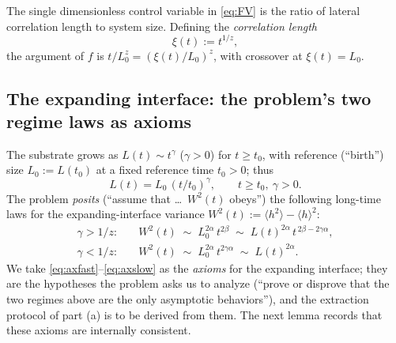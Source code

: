 \documentclass{amsart}
\theoremstyle{definition}
\newcommand{\asymp}{\sim}
\begin{document}
The single dimensionless control variable in \eqref{eq:FV} is the ratio of lateral
correlation length to system size. Defining the \emph{correlation length}
\begin{equation}\label{eq:xi}
  \xi(t):=t^{1/z},
\end{equation}
the argument of $f$ is $t/L_0^{z}=(\xi(t)/L_0)^{z}$, with crossover at
$\xi(t)=L_0$.

\subsection{The expanding interface: the problem's two regime laws as axioms}

The substrate grows as $L(t)\asymp t^{\gamma}$ ($\gamma>0$) for $t\ge t_0$, with
reference (``birth'') size $L_0:=L(t_0)$ at a fixed reference time $t_0>0$; thus
\begin{equation}\label{eq:Lt}
  L(t)=L_0\,(t/t_0)^{\gamma},\qquad t\ge t_0,\ \gamma>0.
\end{equation}
The problem \emph{posits} (``assume that \dots\ $W^2(t)$ obeys'') the following
long-time laws for the expanding-interface variance
$W^2(t):=\langle h^2\rangle-\langle h\rangle^2$:
\begin{align}
  \gamma>1/z:\quad & W^2(t)\;\asymp\; L_0^{2\alpha}\,t^{2\beta}
     \;\asymp\; L(t)^{2\alpha}\,t^{\,2\beta-2\gamma\alpha},\label{eq:axfast}\\
  \gamma<1/z:\quad & W^2(t)\;\asymp\; L_0^{2\alpha}\,t^{2\gamma\alpha}
     \;\asymp\; L(t)^{2\alpha}.\label{eq:axslow}
\end{align}
We take \eqref{eq:axfast}--\eqref{eq:axslow} as the \emph{axioms} for the expanding
interface; they are the hypotheses the problem asks us to analyze (``prove or
disprove that the two regimes above are the only asymptotic behaviors''), and the
extraction protocol of part (a) is to be derived from them. The next lemma records
that these axioms are internally consistent.
\end{document}

